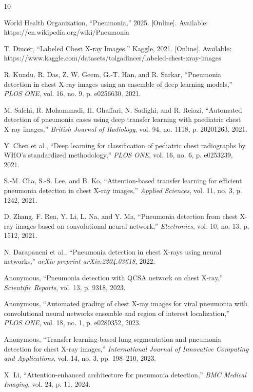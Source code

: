 \documentclass[conference]{IEEEtran}
\begin{document}
\balance

\begin{thebibliography}{10}

World Health Organization, ``Pneumonia,'' 2025. [Online]. Available: https://en.wikipedia.org/wiki/Pneumonia

T. Dincer, ``Labeled Chest X-ray Images,'' Kaggle, 2021. [Online]. Available: https://www.kaggle.com/datasets/tolgadincer/labeled-chest-xray-images

R. Kundu, R. Das, Z. W. Geem, G.-T. Han, and R. Sarkar, ``Pneumonia detection in chest X-ray images using an ensemble of deep learning models,'' \textit{PLOS ONE}, vol. 16, no. 9, p. e0256630, 2021.

M. Salehi, R. Mohammadi, H. Ghaffari, N. Sadighi, and R. Reiazi, ``Automated detection of pneumonia cases using deep transfer learning with paediatric chest X-ray images,'' \textit{British Journal of Radiology}, vol. 94, no. 1118, p. 20201263, 2021.

Y. Chen et al., ``Deep learning for classification of pediatric chest radiographs by WHO's standardized methodology,'' \textit{PLOS ONE}, vol. 16, no. 6, p. e0253239, 2021.

S.-M. Cha, S.-S. Lee, and B. Ko, ``Attention-based transfer learning for efficient pneumonia detection in chest X-ray images,'' \textit{Applied Sciences}, vol. 11, no. 3, p. 1242, 2021.

D. Zhang, F. Ren, Y. Li, L. Na, and Y. Ma, ``Pneumonia detection from chest X-ray images based on convolutional neural network,'' \textit{Electronics}, vol. 10, no. 13, p. 1512, 2021.

N. Darapaneni et al., ``Pneumonia detection in chest X-rays using neural networks,'' \textit{arXiv preprint arXiv:2204.03618}, 2022.

Anonymous, ``Pneumonia detection with QCSA network on chest X-ray,'' \textit{Scientific Reports}, vol. 13, p. 9318, 2023.

Anonymous, ``Automated grading of chest X-ray images for viral pneumonia with convolutional neural networks ensemble and region of interest localization,'' \textit{PLOS ONE}, vol. 18, no. 1, p. e0280352, 2023.

Anonymous, ``Transfer learning-based lung segmentation and pneumonia detection for chest X-ray images,'' \textit{International Journal of Innovative Computing and Applications}, vol. 14, no. 3, pp. 198--210, 2023.

X. Li, ``Attention-enhanced architecture for pneumonia detection,'' \textit{BMC Medical Imaging}, vol. 24, p. 11, 2024.

\end{thebibliography}
\end{document}
